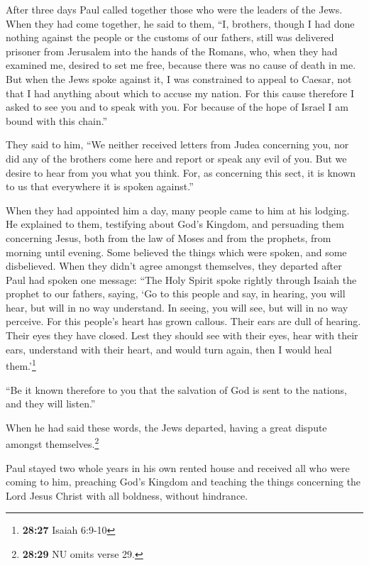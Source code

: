 After three days Paul called together those who were the
leaders of the Jews. When they had come together, he said to them, ``I,
brothers, though I had done nothing against the people or the customs of
our fathers, still was delivered prisoner from Jerusalem into the hands
of the Romans,  who, when they had examined me, desired
to set me free, because there was no cause of death in me.
 But when the Jews spoke against it, I was constrained to
appeal to Caesar, not that I had anything about which to accuse my
nation.  For this cause therefore I asked to see you and
to speak with you. For because of the hope of Israel I am bound with
this chain.''

 They said to him, ``We neither received letters from
Judea concerning you, nor did any of the brothers come here and report
or speak any evil of you.  But we desire to hear from you
what you think. For, as concerning this sect, it is known to us that
everywhere it is spoken against.''

 When they had appointed him a day, many people came to
him at his lodging. He explained to them, testifying about God's
Kingdom, and persuading them concerning Jesus, both from the law of
Moses and from the prophets, from morning until evening. 
Some believed the things which were spoken, and some disbelieved.
 When they didn't agree amongst themselves, they departed
after Paul had spoken one message: ``The Holy Spirit spoke rightly
through Isaiah the prophet to our fathers,  saying, `Go
to this people and say, in hearing, you will hear, but will in no way
understand. In seeing, you will see, but will in no way perceive.
 For this people's heart has grown callous. Their ears
are dull of hearing. Their eyes they have closed. Lest they should see
with their eyes, hear with their ears, understand with their heart, and
would turn again, then I would heal them.'\footnote{\textbf{28:27}
  Isaiah 6:9-10}

 ``Be it known therefore to you that the salvation of God
is sent to the nations, and they will listen.''

 When he had said these words, the Jews departed, having
a great dispute amongst themselves.\footnote{\textbf{28:29} NU omits
  verse 29.}

 Paul stayed two whole years in his own rented house and
received all who were coming to him,  preaching God's
Kingdom and teaching the things concerning the Lord Jesus Christ with
all boldness, without hindrance.
